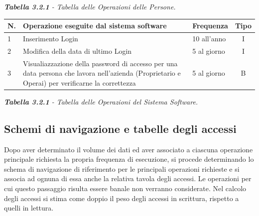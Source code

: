 \documentclass{article}
\begin{document}
\textit{\textbf{Tabella 3.2.1}  - Tabella delle Operazioni delle Persone.}
\newline
\newline
\newline
\begin{tabular}{p{} |p{}| p{}| c}\hline
    \textbf{N.} & \textbf{Operazione eseguite dal sistema software} & \textbf{Frequenza}  & \textbf{Tipo} \\\hline
    1&Inserimento Login & 10 all'anno & I \\\hline
    2&Modifica della data di ultimo Login& 5 al giorno & I\\\hline
    3&Visualiazzazione della password di accesso per una data persona che lavora nell'azienda (Proprietario e Operai) per verificarne la correttezza & 5 al giorno &B \\\hline
\end{tabular}
\newline
\textit{\textbf{Tabella 3.2.1}  - Tabella delle Operazioni del Sistema Software.}

\newpage
\subsection{Schemi di navigazione e tabelle degli accessi}
Dopo aver determinato il volume dei dati ed aver associato a ciascuna operazione principale richiesta la propria frequenza di esecuzione, si procede determinando lo schema di navigazione di riferimento per le principali operazioni richieste e si associa ad ognuna di essa anche la relativa tavola degli accessi. Le operazioni per cui questo passaggio risulta essere banale non verranno considerate. Nel calcolo degli accessi si stima come doppio il peso degli accessi in scrittura, rispetto a quelli in lettura.
\end{document}
